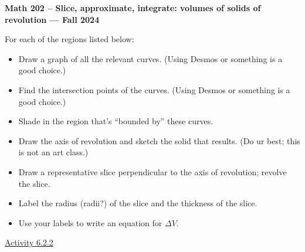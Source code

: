\documentclass[12pt]{article}
\begin{document}
\thispagestyle{empty}
\begin{center}
  \textbf{ Math 202 -- Slice, approximate, integrate: volumes of solids of revolution
  --- Fall 2024
    }
\end{center}

For each of the regions listed below:

\begin{itemize}
    \item Draw a graph of all the relevant curves. (Using Desmos or something is a good choice.)
    \item Find the intersection points of the curves. (Using Desmos or something is a good choice.)
    \item Shade in the region that's ``bounded by'' these curves.
    \item Draw the axis of revolution and sketch the solid that results. (Do ur best; this is not an art class.)
    \item Draw a representative slice perpendicular to the axis of revolution; revolve the slice.
    \item Label the radius (radii?) of the slice and the thickness of the slice.
    \item Use your labels to write an equation for $\Delta V$.
\end{itemize}

\vfill
\href{https://activecalculus.org/single/sec-6-2-volume.html#act-6-2-1}{Activity 6.2.2} \hrulefill
\end{document}
